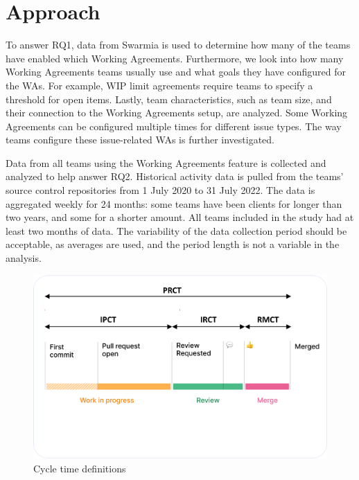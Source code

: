 \section{Approach}

To answer RQ1, data from Swarmia is used to determine how many of the teams have enabled which Working Agreements. Furthermore, we look into how many Working Agreements teams usually use and what goals they have configured for the WAs. For example, WIP limit agreements require teams to specify a threshold for open items. Lastly, team characteristics, such as team size, and their connection to the Working Agreements setup, are analyzed. Some Working Agreements can be configured multiple times for different issue types. The way teams configure these issue-related WAs is further investigated.  

Data from all teams using the Working Agreements feature is collected and analyzed to help answer RQ2. Historical activity data is pulled from the teams' source control repositories from 1 July 2020 to 31 July 2022. The data is aggregated weekly for 24 months: some teams have been clients for longer than two years, and some for a shorter amount. All teams included in the study had at least two months of data. The variability of the data collection period should be acceptable, as averages are used, and the period length is not a variable in the analysis.

\begin{figure}[ht]
    \begin{center}
        \includegraphics[width=13.5cm]{LaTeX/images/cts-defined-arrows.png}
        \caption{Cycle time definitions}
        \label{fig:ctsArrows}
    \end{center}
\end{figure}

